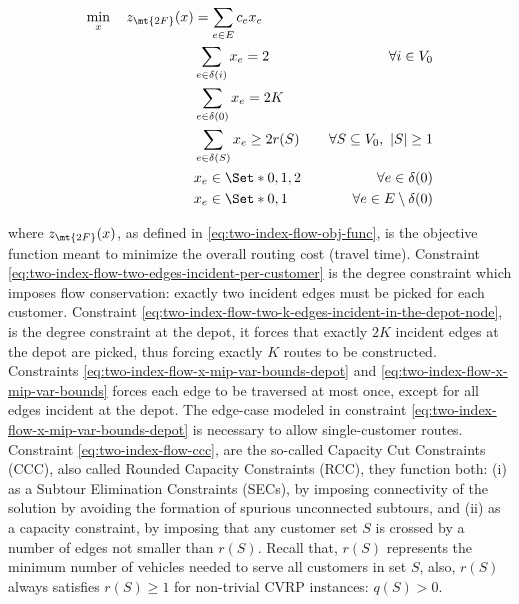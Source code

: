 \begin{align}
	\min_{x} \quad z_\mt{2F}(x) & = \sum_{e \in E} c_e x_e \label{eq:two-index-flow-obj-func}                                                                                        \\
	                            & \sum_{e \in \delta(i)} x_e = 2                              & \quad \forall i \in V_0 \label{eq:two-index-flow-two-edges-incident-per-customer}    \\
	                            & \sum_{e \in \delta(0)} x_e = 2 K                            & \label{eq:two-index-flow-two-k-edges-incident-in-the-depot-node}                     \\
	                            & \sum_{e \in \delta(S)} x_e \ge 2 r(S)                       & \quad \forall S \subseteq V_0,\ |S| \ge 1 \label{eq:two-index-flow-ccc}              \\
	                            & x_e                   \in \Set*{0, 1, 2}                    & \quad \forall e \in \delta(0) \label{eq:two-index-flow-x-mip-var-bounds-depot}       \\
	                            & x_e                   \in \Set*{0, 1}                       & \quad \forall e \in E \setminus \delta(0) \label{eq:two-index-flow-x-mip-var-bounds}
\end{align}

where $z_\mt{2F}(x)$, as defined in \eqref{eq:two-index-flow-obj-func}, is the objective function meant to minimize the overall routing cost (travel time).
Constraint \eqref{eq:two-index-flow-two-edges-incident-per-customer} is the degree constraint which imposes flow conservation: exactly two incident edges must be picked for each customer.
Constraint \eqref{eq:two-index-flow-two-k-edges-incident-in-the-depot-node}, is the degree constraint at the depot, it forces that exactly $2K$ incident edges at the depot are picked, thus forcing exactly $K$ routes to be constructed.
Constraints \eqref{eq:two-index-flow-x-mip-var-bounds-depot} and \eqref{eq:two-index-flow-x-mip-var-bounds} forces each edge to be traversed at most once,
except for all edges incident at the depot.
The edge-case modeled in constraint \eqref{eq:two-index-flow-x-mip-var-bounds-depot} is necessary to allow single-customer routes.
Constraint \eqref{eq:two-index-flow-ccc}, are the so-called Capacity Cut Constraints (CCC), also called Rounded Capacity Constraints (RCC), they function both:
(i) as a Subtour Elimination Constraints (SECs), by imposing connectivity of the solution by avoiding the formation of spurious unconnected subtours,
and (ii) as a capacity constraint, by imposing that any customer set $S$ is crossed by a number of edges not smaller than $r(S)$.
Recall that, $r(S)$ represents the minimum number of vehicles needed to serve all customers in set $S$,
also, $r(S)$ always satisfies $r(S) \ge 1$ for non-trivial CVRP instances: $q(S) > 0$.

